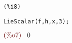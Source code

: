 \noindent
\begin{minipage}[t]{8ex}\color{red}\bf
\begin{verbatim}
(%i8) 
\end{verbatim}
\end{minipage}
\begin{minipage}[t]{\textwidth}
\color{blue}
\begin{verbatim}
LieScalar(f,h,x,3);
\end{verbatim}
\end{minipage}
\begin{math}\displaystyle
\parbox{8ex}{\color{labelcolor}(\%o7) }
0
\end{math}


